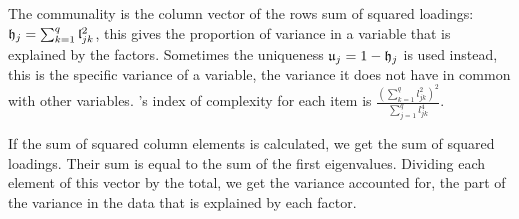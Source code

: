 The communality is the column vector of the rows sum of squared loadings: \(\mathfrak{h}_j = \sum_{k=1}^q{\mathfrak{l}_{jk}^2} \), this gives the proportion of variance in a variable that is explained by the factors. Sometimes the uniqueness \(\mathfrak{u}_j = 1 - \mathfrak{h}_j \) is used instead, this is the specific variance of a variable, the variance it does not have in common with other variables. 's index of complexity \parencite{Hof-77} for each item is \(\frac{(\sum_{k=1}^{q}{l_{jk}^2})^2}{\sum_{j=1}^{q}{l_{jk}^4}} \).

If the sum of squared column elements is calculated, we get the sum of squared loadings. Their sum is equal to the sum of the first  eigenvalues. Dividing each element of this vector by the total, we get the variance accounted for, the part of the variance in the data that is explained by each factor.


